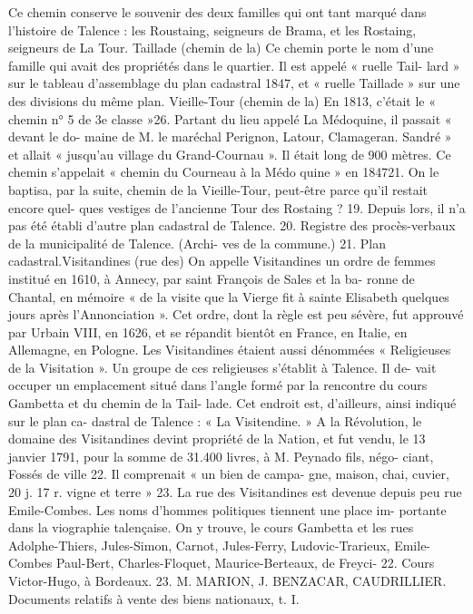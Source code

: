 \documentclass[a4paper,11pt]{book}
\begin{document}
Ce chemin conserve le souvenir des deux familles qui
ont tant marqué dans l'histoire de Talence : les Roustaing,
seigneurs de Brama, et les Rostaing, seigneurs de La
Tour.
Taillade (chemin de la)
Ce chemin porte le nom d'une famille qui avait des
propriétés dans le quartier. Il est appelé « ruelle Tail-
lard » sur le tableau d'assemblage du plan cadastral 1847,
et « ruelle Taillade » sur une des divisions du même plan.
Vieille-Tour (chemin de la)
En 1813, c'était le « chemin n° 5 de 3e classe »26. Partant
du lieu appelé La Médoquine, il passait « devant le do-
maine de M. le maréchal Perignon, Latour, Clamageran.
Sandré » et allait « jusqu'au village du Grand-Cournau ».
Il était long de 900 mètres.
Ce chemin s'appelait « chemin du Courneau à la Médo
quine » en 184721. On le baptisa, par la suite, chemin de
la Vieille-Tour, peut-être parce qu'il restait encore quel-
ques vestiges de l'ancienne Tour des Rostaing ?
19. Depuis lors, il n'a pas été établi d'autre plan cadastral de Talence.
20. Registre des procès-verbaux de la municipalité de Talence. (Archi-
ves de la commune.)
21. Plan cadastral.Visitandines (rue des)
On appelle Visitandines un ordre de femmes institué
en 1610, à Annecy, par saint François de Sales et la ba-
ronne de Chantal, en mémoire « de la visite que la Vierge
fit à sainte Elisabeth quelques jours après l'Annonciation ».
Cet ordre, dont la règle est peu sévère, fut approuvé par
Urbain VIII, en 1626, et se répandit bientôt en France, en
Italie, en Allemagne, en Pologne.
Les Visitandines étaient aussi dénommées « Religieuses
de la Visitation ».
Un groupe de ces religieuses s'établit à Talence. Il de-
vait occuper un emplacement situé dans l'angle formé par
la rencontre du cours Gambetta et du chemin de la Tail-
lade. Cet endroit est, d'ailleurs, ainsi indiqué sur le plan ca-
dastral de Talence : « La Visitendine. »
A la Révolution, le domaine des Visitandines devint
propriété de la Nation, et fut vendu, le 13 janvier 1791,
pour la somme de 31.400 livres, à M. Peynado fils, négo-
ciant, Fossés de ville 22. Il comprenait « un bien de campa-
gne, maison, chai, cuvier, 20 j. 17 r. vigne et terre » 23.
La rue des Visitandines est devenue depuis peu rue
Emile-Combes.
Les noms d'hommes politiques tiennent une place im-
portante dans la viographie talençaise. On y trouve, le
cours Gambetta et les rues Adolphe-Thiers, Jules-Simon,
Carnot, Jules-Ferry, Ludovic-Trarieux, Emile-Combes
Paul-Bert, Charles-Floquet, Maurice-Berteaux, de Freyci-
22. Cours Victor-Hugo, à Bordeaux.
23. M. MARION, J. BENZACAR, CAUDRILLIER. Documents relatifs à
vente des biens nationaux, t. I.
\end{document}
